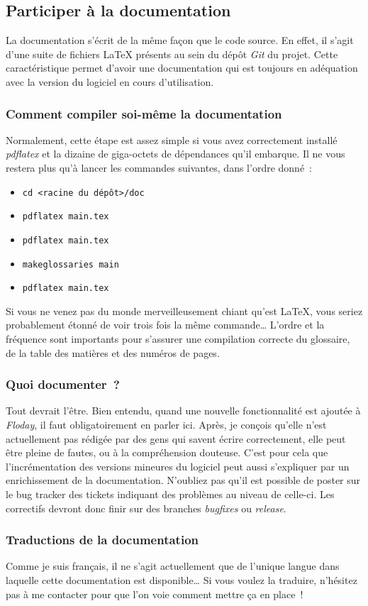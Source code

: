 \subsection{Participer à la documentation}

La documentation s'écrit de la même façon que le code source.
En effet, il s'agit d'une suite de fichiers \LaTeX{} présents au sein du dépôt \emph{Git} du projet.
Cette caractéristique permet d'avoir une documentation qui est toujours en adéquation avec la version du logiciel en cours d'utilisation.

\subsubsection{Comment compiler soi-même la documentation}
Normalement, cette étape est assez simple si vous avez correctement installé \emph{pdflatex} et la dizaine de giga-octets de dépendances qu'il embarque.
Il ne vous restera plus qu'à lancer les commandes suivantes, dans l'ordre donné~:
\begin{itemize}
	\item{\tt cd <racine du dépôt>/doc}
	\item{\tt pdflatex main.tex}
	\item{\tt pdflatex main.tex}
	\item{\tt makeglossaries main}
	\item{\tt pdflatex main.tex}
\end{itemize}
Si vous ne venez pas du monde merveilleusement chiant qu'est \LaTeX, vous seriez probablement étonné de voir trois fois la même commande\dots{}
L'ordre et la fréquence sont importants pour s'assurer une compilation correcte du glossaire, de la table des matières et des numéros de pages.

\subsubsection{Quoi documenter~?}
Tout devrait l'être.
Bien entendu, quand une nouvelle fonctionnalité est ajoutée à \emph{Floday}, il faut obligatoirement en parler ici.
Après, je conçois qu'elle n'est actuellement pas rédigée par des gens qui savent écrire correctement, elle peut être pleine de fautes, ou à la compréhension douteuse.
C'est pour cela que l'incrémentation des versions mineures du logiciel peut aussi s'expliquer par un enrichissement de la documentation.
N'oubliez pas qu'il est possible de poster sur le bug tracker des tickets indiquant des problèmes au niveau de celle-ci.
Les correctifs devront donc finir sur des branches \emph{bugfixes} ou \emph{release}.

\subsubsection{Traductions de la documentation}
Comme je suis français, il ne s'agit actuellement que de l'unique langue dans laquelle cette documentation est disponible\dots{}
Si vous voulez la traduire, n'hésitez pas à me contacter pour que l'on voie comment mettre ça en place~!
